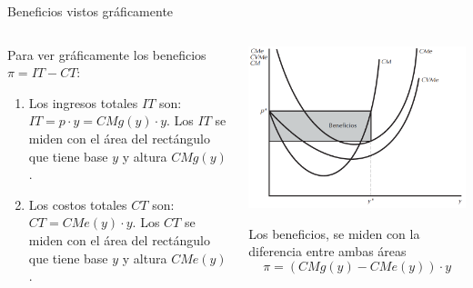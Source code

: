 \documentclass{beamer}
\theoremstyle{definition}
\begin{document}
\begin{frame}{Beneficios vistos gráficamente}
\begin{columns}
    \begin{column}[t]{0.52\textwidth}
\small
\begin{center}
 Para ver gráficamente los beneficios $\pi=IT-CT$:
\begin{enumerate}
    \item Los ingresos totales $IT$ son: $IT=p\cdot y=CMg(y)\cdot y$. Los $IT$ se miden con el \'area del rectángulo que tiene base $y$ y altura $CMg(y)$.
    \item Los costos totales $CT$ son: $CT=CMe(y)\cdot y$. Los $CT$ se miden con el \'area del rectángulo que tiene base $y$ y altura $CMe(y)$.
\end{enumerate} 
\end{center}
\end{column}
\begin{column}[t]{0.46\textwidth}
\begin{center}
\includegraphics[scale=0.38]{figures4/beneficios.png}

 \small Los beneficios, se miden con la diferencia entre ambas \'areas
\[\pi =(CMg(y)-CMe(y))\cdot y\]
\end{center} 
\end{column}
\end{columns}
\end{frame}
\end{document}
